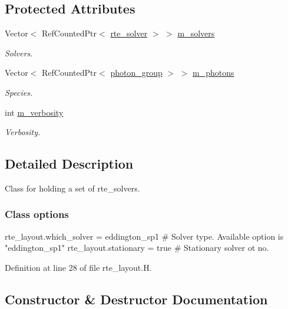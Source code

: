 \subsection*{Protected Attributes}
\begin{DoxyCompactItemize}
\item 
Vector$<$ Ref\+Counted\+Ptr$<$ \hyperlink{classrte__solver}{rte\+\_\+solver} $>$ $>$ \hyperlink{classrte__layout_a200d9f1d395d696976db41beaaa9cbba}{m\+\_\+solvers}
\begin{DoxyCompactList}\small\item\em Solvers. \end{DoxyCompactList}\item 
Vector$<$ Ref\+Counted\+Ptr$<$ \hyperlink{classphoton__group}{photon\+\_\+group} $>$ $>$ \hyperlink{classrte__layout_ad135565a4250d1927706eea59b1fbb2b}{m\+\_\+photons}
\begin{DoxyCompactList}\small\item\em Species. \end{DoxyCompactList}\item 
int \hyperlink{classrte__layout_a4cd602a444d5ac329f12e6ccad4c401f}{m\+\_\+verbosity}
\begin{DoxyCompactList}\small\item\em Verbosity. \end{DoxyCompactList}\end{DoxyCompactItemize}


\subsection{Detailed Description}
Class for holding a set of rte\+\_\+solvers. 

\subsubsection*{Class options }

\begin{DoxyVerb}rte_layout.which_solver = eddington_sp1 # Solver type. Available option is "eddington_sp1"
rte_layout.stationary   = true          # Stationary solver ot no.\end{DoxyVerb}
 

Definition at line 28 of file rte\+\_\+layout.\+H.



\subsection{Constructor \& Destructor Documentation}
